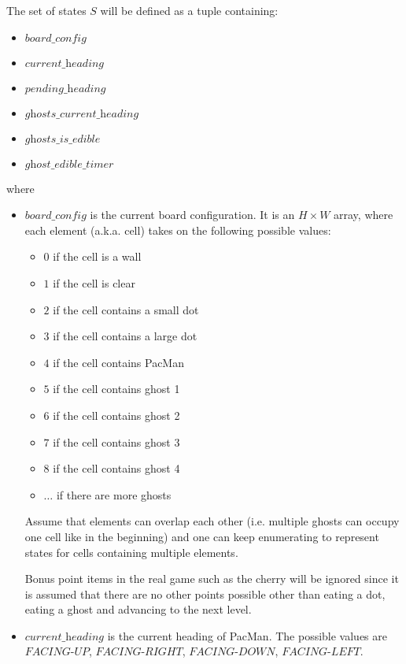 \documentclass[paper=a4, fontsize=11pt]{scrartcl}
\begin{document}
The set of states $S$ will be defined as a tuple containing:

\begin{itemize}
\setlength{\itemsep}{0pt}
\item $\textit{board\_config}$
\item $\textit{current\_heading}$
\item $\textit{pending\_heading}$
\item $\textit{ghosts\_current\_heading}$
\item $\textit{ghosts\_is\_edible}$
\item $\textit{ghost\_edible\_timer}$
\end{itemize}

where

\begin{itemize}
\item $\textit{board\_config}$ is the current board configuration. It is an $H \times W$ array, where each element (a.k.a. cell) takes on the following possible values:

\begin{itemize}
\item $0$ if the cell is a wall
\item $1$ if the cell is clear
\item $2$ if the cell contains a small dot
\item $3$ if the cell contains a large dot
\item $4$ if the cell contains PacMan
\item $5$ if the cell contains ghost 1
\item $6$ if the cell contains ghost 2
\item $7$ if the cell contains ghost 3
\item $8$ if the cell contains ghost 4
\item $\ldots$ if there are more ghosts
\end{itemize}

Assume that elements can overlap each other (i.e. multiple ghosts can occupy one cell like in the beginning) and one can keep enumerating to represent states for cells containing multiple elements.

Bonus point items in the real game such as the cherry will be ignored since it is assumed that there are no other points possible other than eating a dot, eating a ghost and advancing to the next level.

\item $\textit{current\_heading}$ is the current heading of PacMan. The possible values are $\textit{FACING-UP}$, $\textit{FACING-RIGHT}$, $\textit{FACING-DOWN}$, $\textit{FACING-LEFT}$.


\end{itemize}
\end{document}
